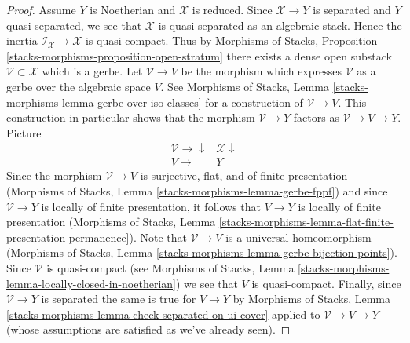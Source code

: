 \begin{proof}
\medskip\noindent
Assume $Y$ is Noetherian and $\mathcal{X}$ is reduced.
Since $\mathcal{X} \to Y$ is separated and $Y$ quasi-separated,
we see that $\mathcal{X}$ is quasi-separated as an algebraic stack.
Hence the inertia $\mathcal{I}_\mathcal{X} \to \mathcal{X}$
is quasi-compact. Thus by Morphisms of Stacks, Proposition
\ref{stacks-morphisms-proposition-open-stratum}
there exists a dense open substack $\mathcal{V} \subset \mathcal{X}$
which is a gerbe. Let $\mathcal{V} \to V$ be the morphism
which expresses $\mathcal{V}$ as a gerbe over the algebraic space $V$.
See
Morphisms of Stacks, Lemma \ref{stacks-morphisms-lemma-gerbe-over-iso-classes}
for a construction of $\mathcal{V} \to V$.
This construction in particular shows that the morphism
$\mathcal{V} \to Y$ factors as $\mathcal{V} \to V \to Y$.
Picture
$$
\begin{array}{cc}\mathcal{V} \longrightarrow\downarrow & \mathcal{X} \downarrow \\ V \longrightarrow & Y\end{array}
$$
Since the morphism $\mathcal{V} \to V$ is surjective, flat, and
of finite presentation
(Morphisms of Stacks, Lemma \ref{stacks-morphisms-lemma-gerbe-fppf})
and since $\mathcal{V} \to Y$ is locally of finite presentation,
it follows that $V \to Y$ is locally of finite presentation
(Morphisms of Stacks, Lemma
\ref{stacks-morphisms-lemma-flat-finite-presentation-permanence}).
Note that $\mathcal{V} \to V$ is a universal homeomorphism
(Morphisms of Stacks, Lemma
\ref{stacks-morphisms-lemma-gerbe-bijection-points}).
Since $\mathcal{V}$ is quasi-compact (see
Morphisms of Stacks, Lemma
\ref{stacks-morphisms-lemma-locally-closed-in-noetherian})
we see that $V$ is quasi-compact.
Finally, since $\mathcal{V} \to Y$ is separated the same is true
for $V \to Y$ by
Morphisms of Stacks, Lemma
\ref{stacks-morphisms-lemma-check-separated-on-ui-cover}
applied to $\mathcal{V} \to V \to Y$
(whose assumptions are satisfied as we've already seen).


\end{proof}
